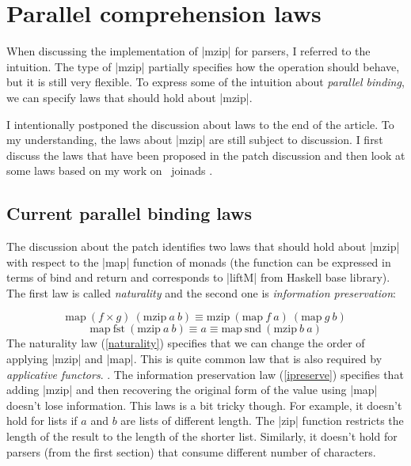 \documentclass{tmr}
\begin{document}
\section{Parallel comprehension laws}
When discussing the implementation of |mzip| for parsers, I referred to the intuition. The type of 
|mzip| partially specifies how the operation should behave, but it is still very flexible. To 
express some of the intuition about \textit{parallel binding}, we can specify laws that should hold 
about |mzip|.

I intentionally postponed the discussion about laws to the end of the article. To my understanding, 
the laws about |mzip| are still subject to discussion. I first discuss the laws  that have been 
proposed in the patch discussion and then look at some laws based on my work
on \fsharp \ joinads \cite{joinads}.

\subsection{Current parallel binding laws}
The discussion about the patch \cite{bringbackmc} identifies two laws that should hold about 
|mzip| with respect to the |map| function of monads (the function can be expressed in 
terms of bind and return and corresponds to |liftM| from Haskell base library). The first law is 
called \textit{naturality} and the second one is \textit{information preservation}:

\begin{equation}
  \text{map} \: (f \times g) \: (\text{mzip} \: a \: b) \equiv \text{mzip} \: (\text{map} \: f \: a) \: (\text{map} \: g \: b)
  \label{naturality}
\end{equation}
\begin{equation}
  \text{map} \: \text{fst} \: (\text{mzip} \: a \: b) \equiv a \equiv \text{map} \: \text{snd} \: (\text{mzip} \: b \: a)
  \label{ipreserve}
\end{equation}
The naturality law (\ref{naturality}) specifies that we can change the order of applying 
|mzip| and |map|. This is quite common law that is also required by \textit{applicative functors}.
\cite{applicative}. The information preservation law (\ref{ipreserve}) specifies that adding 
|mzip| and then recovering the original form of the value using |map| doesn't lose 
information. This laws is a bit tricky though. For example, it doesn't hold for lists if $a$ and $b$ 
are lists of different length. The |zip| function restricts the length of the result to the length 
of the shorter list. Similarly, it doesn't hold for parsers (from the first section) that consume 
different number of characters. 
\end{document}
